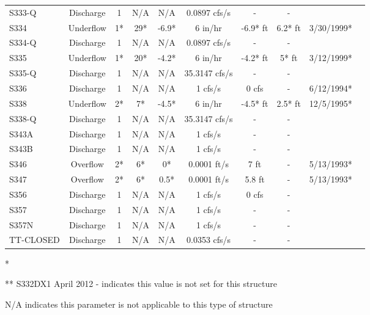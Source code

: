 \begin{table}[h]
\begin{tabular}{@{}lccccccccc@{}}
{S333-Q}        & Discharge     & 1        & N/A         & N/A          & 0.0897 cfs/s   & -               & -          &             \\
{S334}          & Underflow     & 1*       & 29*         & -6.9*        & 6 in/hr        & -6.9* ft        & 6.2* ft    & 3/30/1999*  \\
{S334-Q}        & Discharge     & 1        & N/A         & N/A          & 0.0897 cfs/s   & -               & -          &             \\
{S335}          & Underflow     & 1*       & 20*         & -4.2*        & 6 in/hr        & -4.2* ft        & 5* ft      & 3/12/1999*  \\
{S335-Q}        & Discharge     & 1        & N/A         & N/A          & 35.3147 cfs/s  & -               & -          &             \\
{S336}          & Discharge     & 1        & N/A         & N/A          & 1 cfs/s        &  0 cfs          & -          & 6/12/1994*  \\
{S338}          & Underflow     & 2*       & 7*          & -4.5*        & 6 in/hr        &  -4.5* ft       & 2.5* ft    & 12/5/1995*  \\
{S338-Q}        & Discharge     & 1        & N/A         & N/A          & 35.3147 cfs/s  &  -              & -          &             \\
{S343A}         & Discharge     & 1        & N/A         & N/A          & 1 cfs/s        &  -              & -          &             \\
{S343B}         & Discharge     & 1        & N/A         & N/A          & 1 cfs/s        &  -              & -          &             \\
{S346}          & Overflow      & 2*       & 6*          & 0*           & 0.0001 ft/s    &  7 ft           & -          & 5/13/1993*  \\
{S347}          & Overflow      & 2*       & 6*          & 0.5*         & 0.0001 ft/s    &  5.8 ft         & -          & 5/13/1993*  \\
{S356}          & Discharge     & 1        & N/A         & N/A          & 1 cfs/s        &  0 cfs          & -          &             \\
{S357}          & Discharge     & 1        & N/A         & N/A          & 1 cfs/s        &  -              & -          &             \\
{S357N}         & Discharge     & 1        & N/A         & N/A          & 1 cfs/s        &  -              & -          &             \\
{TT-CLOSED}     & Discharge     & 1        & N/A         & N/A          & 0.0353 cfs/s   &  -              & -          &             \\
\hline
\end{tabular}

* \cite{corp2005}

** S332DX1 April 2012
- indicates this value is not set for this structure

N/A indicates this parameter is not applicable to this type of structure
\end{table}
\normalsize


